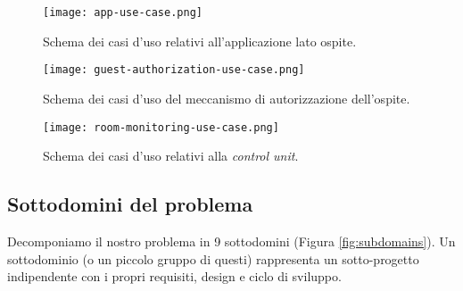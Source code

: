 \begin{figure}[H]
    \texttt{[image: app-use-case.png]}
    \centering
    \caption[app-usecase]{Schema dei casi d'uso relativi all'applicazione lato ospite.}
    \label{fig:app-usecase}
\end{figure}

\begin{figure}[H]
    \texttt{[image: guest-authorization-use-case.png]}
    \centering
    \caption[guest-authorization-usecase]{Schema dei casi d'uso del meccanismo di autorizzazione dell'ospite.}
    \label{fig:guest-authorization-usecase}
\end{figure}

\begin{figure}[H]
    \texttt{[image: room-monitoring-use-case.png]}
    \centering
    \caption[room-monitoring-usecase]{Schema dei casi d'uso relativi alla \textit{control unit}.}
    \label{fig:room-monitoring-usecase}
\end{figure}

\subsection{Sottodomini del problema}
Decomponiamo il nostro problema in 9 sottodomini (Figura \ref*{fig:subdomains}).
Un sottodominio (o un piccolo gruppo di questi) rappresenta un sotto-progetto indipendente con i propri requisiti, design e ciclo di sviluppo.

